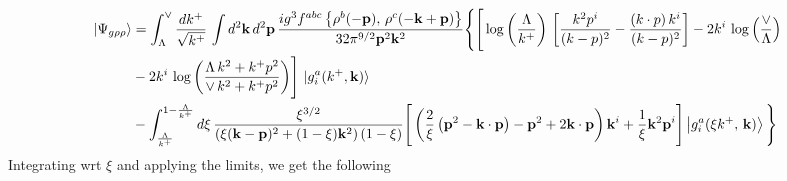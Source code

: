 \documentclass[aps,prd,amsmath,amssymb,nofootinbib]{revtex4-2}
\numberwithin{equation}{section}
\begin{document}
\begin{align}\label{combinedgrhorho}
    \left|\Psi_{g\rho\rho}\right\rangle & =  \int_{\Lambda}^{\vee}\frac{dk^{+}}{\sqrt{k^{+}}}\,\int d^{2}\mathbf{k}\, d^{2}\mathbf{p}\,\frac{ig^{3}f^{abc}\left\{ \rho^{b}(-\mathbf{p}),\,\rho^{c}(-\mathbf{k}+\mathbf{p})\right\}}{32\pi^{9/2}\mathbf{p}^{2}\mathbf{k}^{2}}\Bigg\{\Bigg[\log{\left(\frac{\Lambda}{k^{+}}\right)}\,\left[\frac{k^{2}p^{i}}{(k-p)^{2}}-\frac{(k\cdot p)\,k^{i}}{(k-p)^{2}}\right]-2k^{i}\,\log{\left(\frac{\vee}{\Lambda}\right)}\notag \\ & -2k^{i}\,\log{\left(\frac{\Lambda\,k^{2} + k^{+}p^{2}}{\vee\, k^{2}+k^{+}p^{2}}\right)}\Bigg]\, \ket{g^{a}_{i}(k^{+},\mathbf{k})} \notag \\ & -\int_{\frac{\Lambda}{k^{+}}}^{1-\frac{\Lambda}{k^{+}}}d\xi\,\frac{\xi^{3/2}}{\left(\xi(\mathbf{k}-\mathbf{p})^{2}+(1-\xi)\mathbf{k}^{2}\right)(1-\xi)}\Bigg[\left(\frac{2}{\xi}\left(\mathbf{p}^{2}-\mathbf{k}\cdot\mathbf{p}\right)-\mathbf{p}^{2}+2\mathbf{k}\cdot\mathbf{p}\right)\mathbf{k}^{i} +\frac{1}{\xi}\mathbf{k}^{2}\mathbf{p}^{i}\Bigg]\left|g_{i}^{a}(\xi k^{+},\,\mathbf{k})\right\rangle \Bigg\} 
\end{align}
Integrating wrt $\xi$ and applying the limits, we get the following
\end{document}
